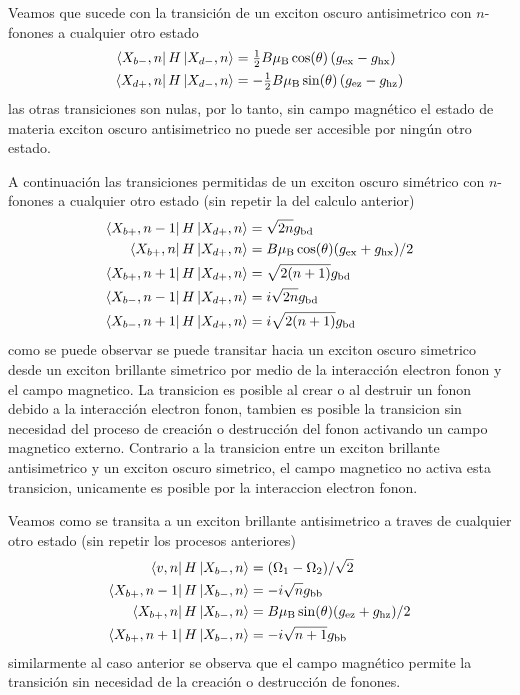\documentclass[../main.tex]{subfiles}
\begin{document}
Veamos que sucede con la transición de un exciton oscuro antisimetrico con $n$-fonones a cualquier otro estado
\begin{align*}
    \bra{X_{b-},n} H \ket{X_{d-},n} &= \tfrac{1}{2} B \mu _{\text{B}} \cos (\theta ) \left(g_{\text{ex}}-g_{\text{hx}}\right)\\
    \bra{X_{d+},n} H \ket{X_{d-},n} &= -\tfrac{1}{2} B \mu _{\text{B}} \sin (\theta ) \left(g_{\text{ez}}-g_{\text{hz}}\right)
\end{align*}
las otras transiciones son nulas, por lo tanto, sin campo magnético el estado de materia exciton oscuro antisimetrico  no puede ser accesible por ningún otro estado. 

A continuación las transiciones permitidas de un exciton oscuro simétrico con $n$-fonones a cualquier otro estado (sin repetir la del calculo anterior)
\begin{align*}
    \bra{X_{b+},n-1} H \ket{X_{d+},n} &= \sqrt{2n} g_\text{bd}\\
    \bra{X_{b+},n} H \ket{X_{d+},n} &= B \mu_\text{B} \cos(\theta ) (g_\text{ex}+g_\text{hx})/2\\
    \bra{X_{b+},n+1} H \ket{X_{d+},n} &= \sqrt{2(n+1)} g_\text{bd}\\
    \bra{X_{b-},n-1} H \ket{X_{d+},n} &= i \sqrt{2n} g_\text{bd}\\
    \bra{X_{b-},n+1} H \ket{X_{d+},n} &= i \sqrt{2(n+1)} g_\text{bd}
\end{align*}
como se puede observar se puede transitar hacia un exciton oscuro simetrico desde un exciton brillante simetrico por medio de la interacción electron fonon y el campo magnetico. La transicion es posible al crear o al destruir un fonon debido a la interacción electron fonon, tambien es posible la transicion sin necesidad del proceso de creación o destrucción del fonon activando un campo magnetico externo. Contrario a la transicion entre un exciton brillante antisimetrico y un exciton oscuro simetrico, el campo magnetico no activa esta transicion, unicamente es posible por la interaccion electron fonon.

Veamos como se transita a un exciton brillante antisimetrico a traves de cualquier otro estado (sin repetir los procesos anteriores)
\begin{align*}
    \bra{v,n} H \ket{X_{b-},n} &= (\Omega_1-\Omega_2)/\sqrt{2}\\
    \bra{X_{b+},n-1} H \ket{X_{b-},n} &= -i \sqrt{n} g_\text{bb}\\
    \bra{X_{b+},n} H \ket{X_{b-},n} &= B \mu_\text{B} \sin(\theta) (g_\text{ez}+g_\text{hz})/2\\
    \bra{X_{b+},n+1} H \ket{X_{b-},n} &= -i \sqrt{n+1} g_\text{bb}
\end{align*}
similarmente al caso anterior se observa que el campo magnético permite la transición sin necesidad de la creación o destrucción de fonones.
\end{document}

